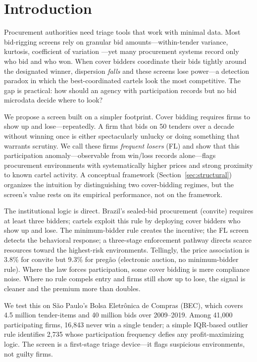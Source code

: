\section{Introduction}
\label{sec:intro}

Procurement authorities need triage tools that work with minimal
data. Most bid-rigging screens rely on granular bid
amounts---within-tender variance, kurtosis, coefficient of variation
\citep{imhof2019detecting, huber2019machine}---yet many procurement
systems record only who bid and who won. When cover bidders coordinate their bids tightly around the
designated winner, dispersion \emph{falls} and these screens lose
power---a detection paradox in which the best-coordinated cartels
look the most competitive. The gap is practical: how should an
agency with participation records but no bid microdata decide where
to look?

We propose a screen built on a simpler footprint. Cover bidding
requires firms to show up and lose---repeatedly. A firm that bids
on 50 tenders over a decade without winning once is either
spectacularly unlucky or doing something that warrants scrutiny. We
call these firms \emph{frequent losers} (FL) and show that this
participation anomaly---observable from win/loss records
alone---flags procurement environments with systematically higher
prices and strong proximity to known cartel activity. A conceptual
framework (Section~\ref{sec:structural}) organizes the intuition by
distinguishing two cover-bidding regimes, but the screen's value
rests on its empirical performance, not on the framework.

The institutional logic is direct. Brazil's sealed-bid procurement
(convite) requires at least three bidders; cartels exploit this rule
by deploying cover bidders who show up and lose. The minimum-bidder
rule creates the incentive; the FL screen detects the behavioral
response; a three-stage enforcement pathway directs scarce resources
toward the highest-risk environments. Tellingly, the price
association is 3.8\% for convite but 9.3\% for preg\~ao (electronic
auction, no minimum-bidder rule). Where the law forces participation,
some cover bidding is mere compliance noise. Where no rule compels
entry and firms still show up to lose, the signal is cleaner and
the premium more than doubles.

We test this on S\~ao Paulo's Bolsa Eletr\^onica de Compras (BEC),
which covers 4.5 million tender-items and 40 million bids over
2009--2019. Among 41,000 participating firms, 16,843 never win a
single tender; a simple IQR-based outlier rule identifies 2,735
whose participation frequency defies any profit-maximizing logic.
The screen is a first-stage triage device---it flags suspicious
environments, not guilty firms.

